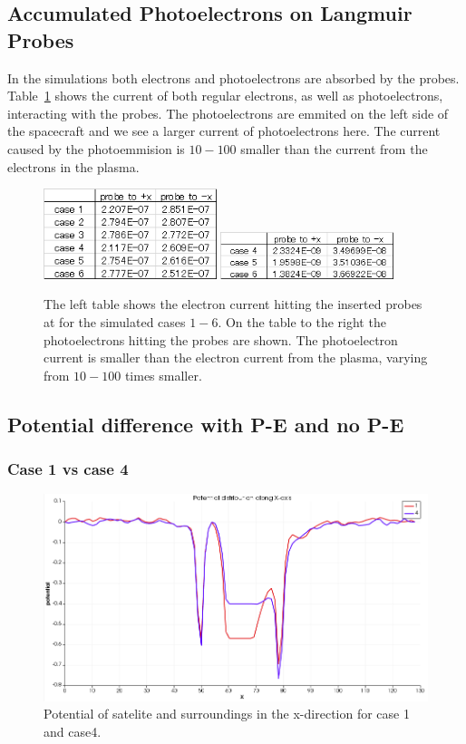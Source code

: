 \subsection{Accumulated Photoelectrons on Langmuir Probes}

In the simulations both electrons and photoelectrons are absorbed by the probes. Table~\ref{tab:elec_current} shows the current
of both regular electrons, as well as photoelectrons, interacting with the probes.
The photoelectrons are emmited on the left side of the spacecraft and we see a larger current of
photoelectrons here. The current caused by the photoemmision is \(10-100\) smaller than the current
from the electrons in the plasma.

\begin{figure}[h]
	\includegraphics[width = 0.45\textwidth]{images/caliculation_of_electron_current}
	\includegraphics[width = 0.45\textwidth]{images/caliculation_of_PE_current}
	\caption{The left table shows the electron current hitting the inserted probes at
	for the simulated cases \(1-6\). On the table to the right the photoelectrons hitting the probes are shown.
	The photoelectron current is smaller than the electron current from the plasma, varying from \(10-100\) times smaller.}
	\label{tab:elec_current}
\end{figure}

\subsection{Potential difference with P-E and no P-E}

\subsubsection{Case 1 vs case 4}

\begin{figure}
    \includegraphics[width = 0.3 \textwidth]{images/pot_case14.png}
    \caption{Potential of satelite and surroundings in the x-direction for case 1 and case4.}
\end{figure}


